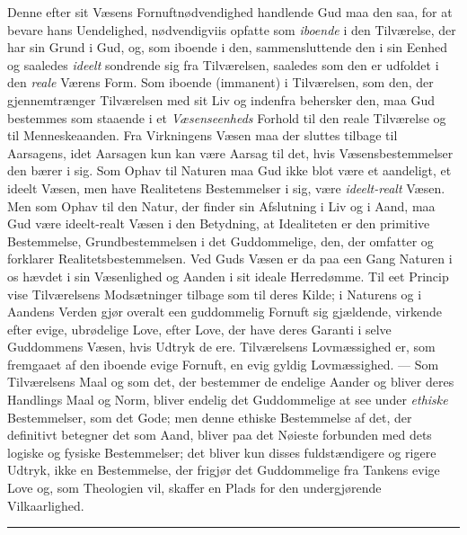 \documentclass[12pt,a4paper,openany]{book}
\newcommand{\opage}[1]{\marginnote{\footnotesize\textit{[#1]}}}
\begin{document}
Denne efter sit Væsens Fornuftnødvendighed handlende
Gud maa den saa, for at bevare hans Uendelighed, nødvendigviis
opfatte som \emph{iboende} i den Tilværelse, der har sin Grund
i Gud, og, som iboende i den, sammensluttende den i sin
Eenhed og saaledes \emph{ideelt} sondrende sig fra Tilværelsen,
saaledes som den er udfoldet i den \emph{reale} Værens Form.
Som iboende (immanent) i Tilværelsen, som den, der gjennemtrænger
Tilværelsen med sit Liv og indenfra behersker den,
maa Gud bestemmes som staaende i et \emph{Væsenseenheds} Forhold
til den reale Tilværelse og til Menneskeaanden. Fra Virkningens
Væsen maa der sluttes tilbage til Aarsagens, idet
Aarsagen kun kan være Aarsag til det, hvis Væsensbestemmelser
den bærer i sig. Som Ophav til Naturen maa Gud ikke
blot være et aandeligt, et ideelt Væsen, men have Realitetens
Bestemmelser i sig, være \emph{ideelt-realt} Væsen. Men som
Ophav til den Natur, der finder sin Afslutning i Liv og i
Aand, maa Gud være ideelt-realt Væsen i den Betydning,
at Idealiteten er den primitive Bestemmelse, Grundbestemmelsen
\opage{502}i det Guddommelige, den, der omfatter og forklarer Realitetsbestemmelsen.
Ved Guds Væsen er da paa een Gang Naturen
i os hævdet i sin Væsenlighed og Aanden i sit ideale Herredømme.
Til eet Princip vise Tilværelsens Modsætninger
tilbage som til deres Kilde; i Naturens og i Aandens Verden
gjør overalt een guddommelig Fornuft sig gjældende, virkende
efter evige, ubrødelige Love, efter Love, der have deres Garanti
i selve Guddommens Væsen, hvis Udtryk de ere. Tilværelsens
Lovmæssighed er, som fremgaaet af den iboende evige Fornuft,
en evig gyldig Lovmæssighed. — Som Tilværelsens Maal
og som det, der bestemmer de endelige Aander og bliver deres
Handlings Maal og Norm, bliver endelig det Guddommelige
at see under \emph{ethiske} Bestemmelser, som det Gode; men denne
ethiske Bestemmelse af det, der definitivt betegner det som
Aand, bliver paa det Nøieste forbunden med dets logiske og
fysiske Bestemmelser; det bliver kun disses fuldstændigere og
rigere Udtryk, ikke en Bestemmelse, der frigjør det Guddommelige
fra Tankens evige Love og, som Theologien vil,
skaffer en Plads for den undergjørende Vilkaarlighed.

\begin{center}\rule{1.8cm}{0.4pt}\end{center}
\end{document}
